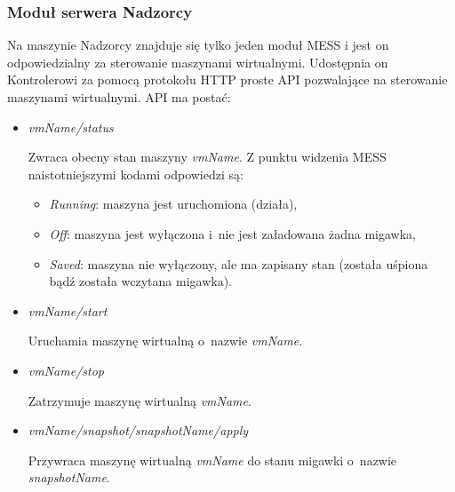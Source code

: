 \documentclass[a4paper,12pt,oneside]{article}
\begin{document}
	\subsubsection{Moduł serwera Nadzorcy}
	Na maszynie Nadzorcy znajduje się tylko jeden moduł MESS i jest on odpowiedzialny za sterowanie maszynami wirtualnymi. Udostępnia on Kontrolerowi za pomocą protokołu HTTP proste API pozwalające na sterowanie maszynami wirtualnymi. API ma postać:
	\begin{itemize}
		\item \textit{vmName/status}
		
		Zwraca obecny stan maszyny \textit{vmName}. Z punktu widzenia MESS naistotniejszymi kodami odpowiedzi są:
		\begin{itemize}
			\item \textit{Running}: maszyna jest uruchomiona (działa),
			\item \textit{Off}: maszyna jest wyłączona i~nie jest załadowana żadna migawka,
			\item \textit{Saved}: maszyna nie wyłączony, ale ma zapisany stan (została uśpiona bądź została wczytana migawka).
		\end{itemize}
	
		\item \textit{vmName/start}
		
		Uruchamia maszynę wirtualną o~nazwie \textit{vmName}.
		
		\item \textit{vmName/stop}
		
		Zatrzymuje maszynę wirtualną \textit{vmName}.
	
		\item \textit{vmName/snapshot/snapshotName/apply}
		
		Przywraca maszynę wirtualną \textit{vmName} do stanu migawki o~nazwie \textit{snapshotName}.
	\end{itemize}
	
\end{document}
